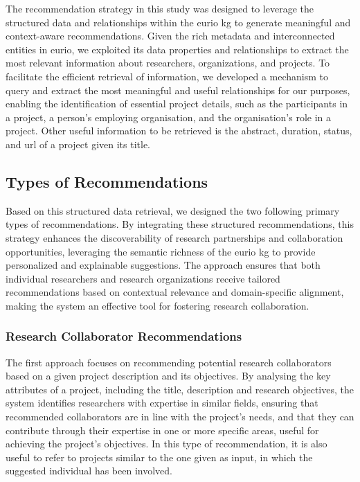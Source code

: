 

The recommendation strategy in this study was designed to leverage the structured data and relationships within the \gls{eurio} \gls{kg} to generate meaningful and context-aware recommendations.
Given the rich metadata and interconnected entities in \gls{eurio}, we exploited its data properties and relationships to extract the most relevant information about researchers, organizations, and projects.
To facilitate the efficient retrieval of information, we developed a mechanism to query and extract the most meaningful and useful relationships for our purposes, enabling the identification of essential project details, such as the participants in a project, a person's employing organisation, and the organisation's role in a project.
Other useful information to be retrieved is the abstract, duration, status, and url of a project given its title.


\subsection*{Types of Recommendations}
Based on this structured data retrieval, we designed the two following primary types of recommendations.
By integrating these structured recommendations, this strategy enhances the discoverability of research partnerships and collaboration opportunities, leveraging the semantic richness of the \gls{eurio} \gls{kg} to provide personalized and explainable suggestions. The approach ensures that both individual researchers and research organizations receive tailored recommendations based on contextual relevance and domain-specific alignment, making the system an effective tool for fostering research collaboration.

\subsubsection*{Research Collaborator Recommendations}
The first approach focuses on recommending potential research collaborators based on a given project description and its objectives.
By analysing the key attributes of a project, including the title, description and research objectives, the system identifies researchers with expertise in similar fields, ensuring that recommended collaborators are in line with the project's needs, and that they can contribute through their expertise in one or more specific areas, useful for achieving the project's objectives.
In this type of recommendation, it is also useful to refer to projects similar to the one given as input, in which the suggested individual has been involved.


